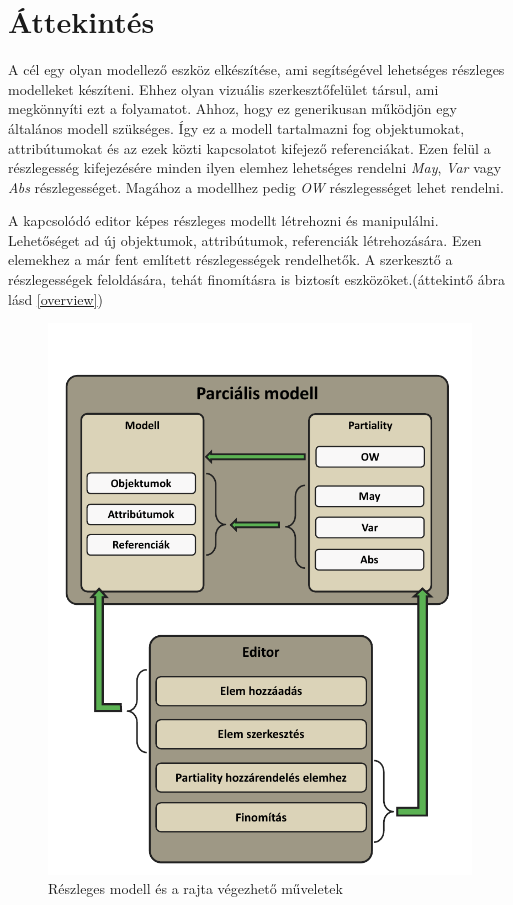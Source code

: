 \chapter{Áttekintés}


A cél egy olyan modellező eszköz elkészítése, ami segítségével lehetséges részleges modelleket készíteni. Ehhez olyan vizuális szerkesztőfelület társul, ami megkönnyíti ezt a folyamatot. Ahhoz, hogy ez generikusan működjön egy általános modell szükséges. Így ez a modell tartalmazni fog objektumokat, attribútumokat és az ezek közti kapcsolatot kifejező referenciákat. Ezen felül a részlegesség kifejezésére minden ilyen elemhez lehetséges rendelni \textit{May}, \textit{Var} vagy \textit{Abs} részlegességet. Magához a modellhez pedig \textit{OW} részlegességet lehet rendelni.
\par
A kapcsolódó editor képes részleges modellt létrehozni és manipulálni. Lehetőséget ad új objektumok, attribútumok, referenciák létrehozására. Ezen elemekhez a már fent említett részlegességek rendelhetők. A szerkesztő a részlegességek feloldására, tehát finomításra is biztosít eszközöket.(áttekintő ábra lásd \autoref{overview})



\begin{figure}[!ht]
	\includegraphics[width=150mm]{figures/overview.pdf}
	\caption{Részleges modell és a rajta végezhető műveletek} 
	\label{overview}
\end{figure}

